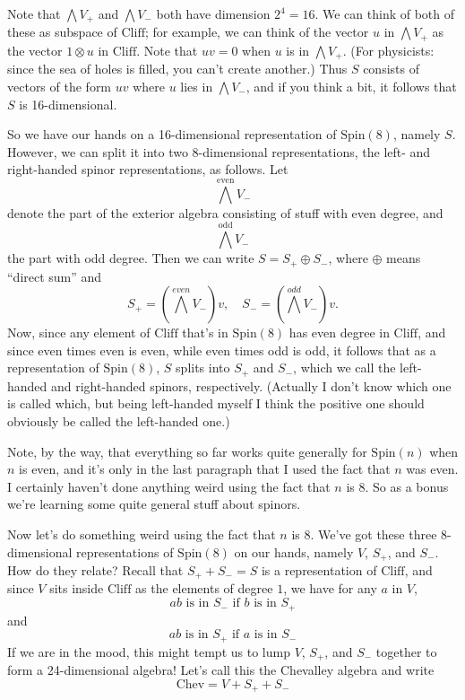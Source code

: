 \documentclass{article}
\begin{document}
Note that \(\bigwedge V_+\) and \(\bigwedge V_-\) both have dimension
\(2^4 = 16\). We can think of both of these as subspace of
\(\mathrm{Cliff}\); for example, we can think of the vector \(u\) in
\(\bigwedge V_+\) as the vector \(1 \otimes u\) in \(\mathrm{Cliff}\).
Note that \(uv = 0\) when \(u\) is in \(\bigwedge V_+\). (For
physicists: since the sea of holes is filled, you can't create another.)
Thus \(S\) consists of vectors of the form \(uv\) where \(u\) lies in
\(\bigwedge V_-\), and if you think a bit, it follows that \(S\) is
16-dimensional.

So we have our hands on a 16-dimensional representation of
\(\mathrm{Spin}(8)\), namely \(S\). However, we can split it into two
8-dimensional representations, the left- and right-handed spinor
representations, as follows. Let \[\bigwedge^\text{even} V_-\] denote
the part of the exterior algebra consisting of stuff with even degree,
and \[\bigwedge^\text{odd} V_-\] the part with odd degree. Then we can
write \(S = S_+ \oplus S_-\), where \(\oplus\) means ``direct sum'' and
\[S_+ = (\bigwedge^{even} V_-)v , \quad  S_- = (\bigwedge^{odd} V_-)v.\]
Now, since any element of \(\mathrm{Cliff}\) that's in
\(\mathrm{Spin}(8)\) has even degree in \(\mathrm{Cliff}\), and since
even times even is even, while even times odd is odd, it follows that as
a representation of \(\mathrm{Spin}(8)\), \(S\) splits into \(S_+\) and
\(S_-\), which we call the left-handed and right-handed spinors,
respectively. (Actually I don't know which one is called which, but
being left-handed myself I think the positive one should obviously be
called the left-handed one.)

Note, by the way, that everything so far works quite generally for
\(\mathrm{Spin}(n)\) when \(n\) is even, and it's only in the last
paragraph that I used the fact that \(n\) was even. I certainly haven't
done anything weird using the fact that \(n\) is 8. So as a bonus we're
learning some quite general stuff about spinors.

Now let's do something weird using the fact that \(n\) is 8. We've got
these three 8-dimensional representations of \(\mathrm{Spin}(8)\) on our
hands, namely \(V\), \(S_+\), and \(S_-\). How do they relate? Recall
that \(S_+ + S_- = S\) is a representation of \(\mathrm{Cliff}\), and
since \(V\) sits inside \(\mathrm{Cliff}\) as the elements of degree
\(1\), we have for any \(a\) in \(V\),
\[\mbox{$ab$ is in $S_-$ if $b$ is in $S_+$}\] and
\[\mbox{$ab$ is in $S_+$ if $a$ is in $S_-$}\] If we are in the mood,
this might tempt us to lump \(V\), \(S_+\), and \(S_-\) together to form
a 24-dimensional algebra! Let's call this the Chevalley algebra and
write \[\mathrm{Chev} = V + S_+ + S_-\]
\end{document}
